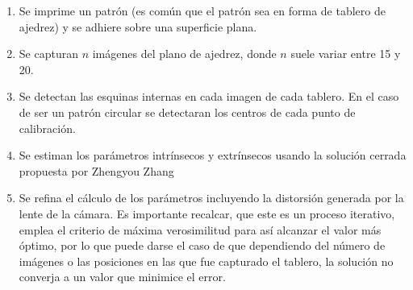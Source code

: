 \begin{enumerate}
\item Se imprime un patrón (es común que el patrón sea en forma de tablero de ajedrez) y se adhiere sobre una superficie plana.
\item Se capturan $n$ imágenes del plano de ajedrez, donde $n$ suele variar entre 15 y 20.
\item Se detectan las esquinas internas en cada imagen de cada tablero. En el caso de ser un patrón circular se detectaran los centros de cada punto de calibración.
\item Se estiman los parámetros intrínsecos y extrínsecos usando la solución cerrada propuesta por Zhengyou Zhang \cite{Zhang2000}
\item Se refina el cálculo de los parámetros incluyendo la distorsión generada por la lente de la cámara. Es importante recalcar, que este es un proceso iterativo, emplea el criterio de máxima verosimilitud para así alcanzar el valor más óptimo, por lo que puede darse el caso de que dependiendo del número de imágenes o las posiciones en las que fue capturado el tablero, la solución no converja a un valor que minimice el error.
\end{enumerate}
